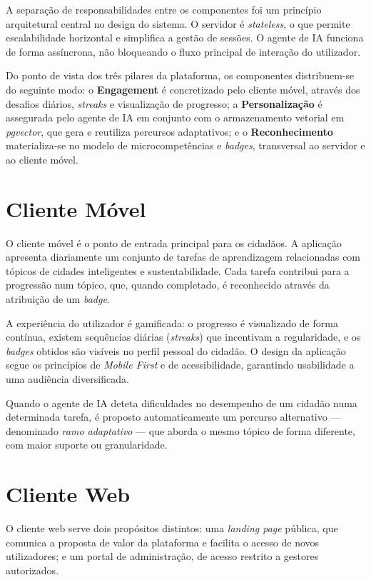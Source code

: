 A separação de responsabilidades entre os componentes foi um princípio arquitetural central no design do sistema. O servidor é \textit{stateless}, o que permite escalabilidade horizontal e simplifica a gestão de sessões. O agente de IA funciona de forma assíncrona, não bloqueando o fluxo principal de interação do utilizador.

Do ponto de vista dos três pilares da plataforma, os componentes distribuem-se do seguinte modo: o \textbf{Engagement} é concretizado pelo cliente móvel, através dos desafios diários, \textit{streaks} e visualização de progresso; a \textbf{Personalização} é assegurada pelo agente de IA em conjunto com o armazenamento vetorial em \textit{pgvector}, que gera e reutiliza percursos adaptativos; e o \textbf{Reconhecimento} materializa-se no modelo de microcompetências e \textit{badges}, transversal ao servidor e ao cliente móvel.

\section{Cliente Móvel}
\label{sec:cliente_movel}

O cliente móvel é o ponto de entrada principal para os cidadãos. A aplicação apresenta diariamente um conjunto de tarefas de aprendizagem relacionadas com tópicos de cidades inteligentes e sustentabilidade. Cada tarefa contribui para a progressão num tópico, que, quando completado, é reconhecido através da atribuição de um \textit{badge}.

A experiência do utilizador é gamificada: o progresso é visualizado de forma contínua, existem sequências diárias (\textit{streaks}) que incentivam a regularidade, e os \textit{badges} obtidos são visíveis no perfil pessoal do cidadão. O design da aplicação segue os princípios de \textit{Mobile First} e de acessibilidade, garantindo usabilidade a uma audiência diversificada.

Quando o agente de IA deteta dificuldades no desempenho de um cidadão numa determinada tarefa, é proposto automaticamente um percurso alternativo --- denominado \textit{ramo adaptativo} --- que aborda o mesmo tópico de forma diferente, com maior suporte ou granularidade.

\section{Cliente Web}
\label{sec:cliente_web}

O cliente web serve dois propósitos distintos: uma \textit{landing page} pública, que comunica a proposta de valor da plataforma e facilita o acesso de novos utilizadores; e um portal de administração, de acesso restrito a gestores autorizados.

